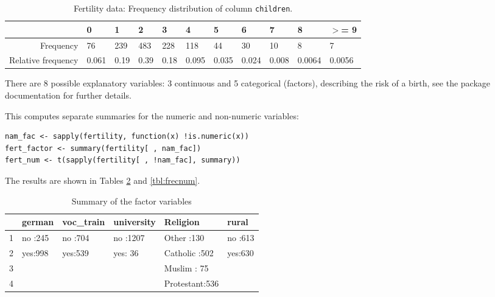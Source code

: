 \documentclass[a4paper,twoside,11pt]{article}
\begin{document}
\begin{table}[ht]
\centering
\begin{tabular}{rllllllllll}
  \hline
 & 0 & 1 & 2 & 3 & 4 & 5 & 6 & 7 & 8 & $>$= 9 \\ 
  \hline
Frequency & 76 & 239 & 483 & 228 & 118 & 44 & 30 & 10 & 8 & 7 \\ 
  Relative frequency & 0.061 & 0.19 & 0.39 & 0.18 & 0.095 & 0.035 & 0.024 & 0.008 & 0.0064 & 0.0056 \\ 
   \hline
\end{tabular}
\caption{Fertility data: Frequency distribution of column \texttt{children}.} 
\label{tbl:freq}
\end{table}

There are 
8
possible explanatory variables: 
3
continuous and 
5
categorical (factors), describing the risk of a birth, see the package documentation for
further details. 

This computes separate summaries for the numeric and non-numeric variables:
\begin{verbatim}
nam_fac <- sapply(fertility, function(x) !is.numeric(x))
fert_factor <- summary(fertility[ , nam_fac])
fert_num <- t(sapply(fertility[ , !nam_fac], summary))
\end{verbatim}

The results are shown in Tables \ref{tbl:frecfac} and \ref{tbl:frecnum}.
\begin{table}[ht]
\centering
\begin{tabular}{rlllll}
  \hline
 & german & voc\_train & university &       Religion & rural \\ 
  \hline
1 & no :245   & no :704   & no :1207   & Other     :130   & no :613   \\ 
  2 & yes:998   & yes:539   & yes:  36   & Catholic  :502   & yes:630   \\ 
  3 &  &  &  & Muslim    : 75   &  \\ 
  4 &  &  &  & Protestant:536   &  \\ 
   \hline
\end{tabular}
\caption{Summary of the factor variables} 
\label{tbl:frecfac}
\end{table}
\end{document}

